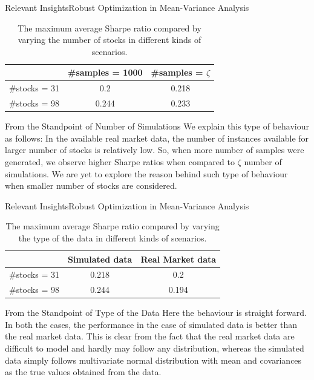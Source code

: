 \documentclass{beamer}
\begin{document}
\begin{frame}{Relevant Insights}{Robust Optimization in Mean-Variance Analysis}

\begin{table}[!h]
    \centering
    \small
    \captionsetup{justification=centering}
   \begin{tabular}{||c|c|c||}
   \hline
  & \#samples = 1000 & \#samples = $\zeta$ \\
  \hline
  \#stocks = 31  & 0.2    &0.218\\
 \#stocks = 98 &   0.244  & 0.233 \\
 \hline
\end{tabular}
    \caption{The maximum average Sharpe ratio compared by varying the number of stocks in different kinds of scenarios.}
    \label{tab:no_samples}
\end{table}
\begin{block}{From the Standpoint of Number of Simulations}
We explain this type of behaviour as follows: In the available real market data, the number of instances available for larger number of stocks is relatively low. So, when  more number of samples were generated, we observe higher Sharpe ratios when compared to $\zeta$ number of simulations. We are yet to explore the reason behind such type of behaviour when smaller number of stocks are considered.
\end{block}
\vfill
\end{frame}

\begin{frame}{Relevant Insights}{Robust Optimization in Mean-Variance Analysis}
\begin{table}[!h]
    \centering
    \small
    \captionsetup{justification=centering}
   \begin{tabular}{||c|c|c||}
   \hline
  & Simulated data & Real Market data \\
  \hline
  \#stocks = 31  & 0.218    &0.2\\
 \#stocks = 98 &   0.244  & 0.194  \\
 \hline
\end{tabular}
    \caption{The maximum average Sharpe ratio compared by varying the type of the data in different kinds of scenarios.}
    \label{tab:data_type}
\end{table}
\begin{block}{From the Standpoint of Type of the Data}
Here the behaviour is straight forward. In both the cases, the performance in the case of simulated data is better than the real market data. This is clear from the fact that the real market data are difficult to model and hardly may follow any distribution, whereas the simulated data simply follows multivariate normal distribution with mean and covariances as the true values obtained from the data.
\end{block}
\vfill
\end{frame}
\end{document}
